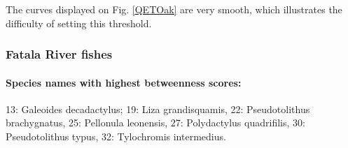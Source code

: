 The curves displayed on Fig. \ref{QETOak} are very smooth, which illustrates the difficulty of setting this threshold.


\subsubsection{Fatala River fishes}
\label{names_Baran}
\paragraph{Species names with highest betweenness scores:}
  13: Galeoides decadactylus; 19: Liza grandisquamis, 22:  Pseudotolithus brachygnatus, 25: Pellonula leonensis, 27:  Polydactylus quadrifilis, 30: Pseudotolithus typus, 32: Tylochromis intermedius.
